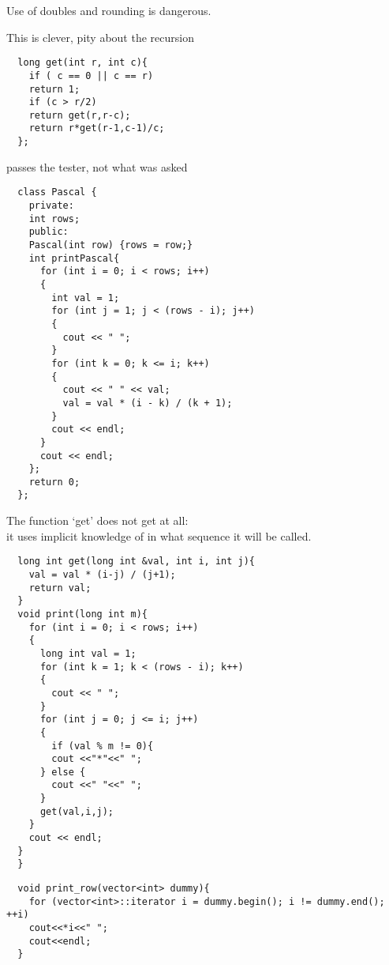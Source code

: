 Use of doubles and rounding is dangerous.


This is clever, pity about the recursion

\begin{lstlisting}
  long get(int r, int c){
    if ( c == 0 || c == r)
    return 1;
    if (c > r/2)
    return get(r,r-c);
    return r*get(r-1,c-1)/c;
  };
\end{lstlisting}


passes the tester, not what was asked

\begin{lstlisting}
  class Pascal {
    private:
    int rows;
    public:
    Pascal(int row) {rows = row;}
    int printPascal{
      for (int i = 0; i < rows; i++)
      {
        int val = 1;
        for (int j = 1; j < (rows - i); j++)
        {
          cout << " ";
        }
        for (int k = 0; k <= i; k++)
        {
          cout << " " << val;
          val = val * (i - k) / (k + 1);
        }
        cout << endl;
      }
      cout << endl;
    };
    return 0;
  };
\end{lstlisting}


The function `get' does not get at all:\\
it uses implicit knowledge of in what sequence it will be called.

\begin{lstlisting}
  long int get(long int &val, int i, int j){
    val = val * (i-j) / (j+1);
    return val;
  }
  void print(long int m){
    for (int i = 0; i < rows; i++)
    {
      long int val = 1;
      for (int k = 1; k < (rows - i); k++)
      {
        cout << " ";
      }
      for (int j = 0; j <= i; j++)
      {
        if (val % m != 0){
        cout <<"*"<<" ";
      } else {
        cout <<" "<<" ";
      }
      get(val,i,j);
    }
    cout << endl;
  }
  }
\end{lstlisting}


\begin{lstlisting}
  void print_row(vector<int> dummy){
    for (vector<int>::iterator i = dummy.begin(); i != dummy.end(); ++i)
    cout<<*i<<" ";
    cout<<endl;
  }
\end{lstlisting}


